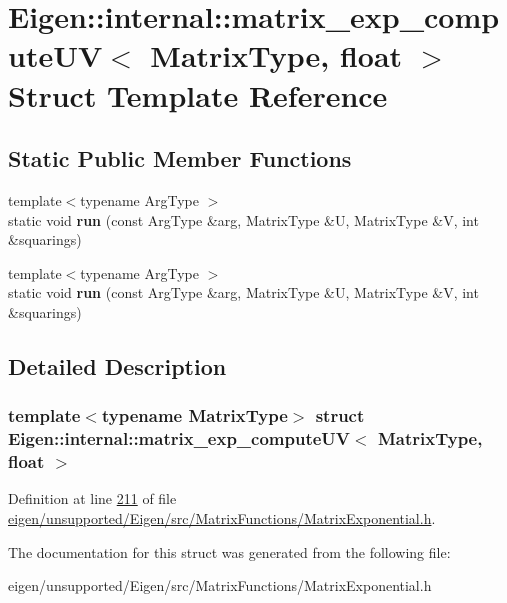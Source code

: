 \hypertarget{struct_eigen_1_1internal_1_1matrix__exp__compute_u_v_3_01_matrix_type_00_01float_01_4}{}\section{Eigen\+:\+:internal\+:\+:matrix\+\_\+exp\+\_\+compute\+UV$<$ Matrix\+Type, float $>$ Struct Template Reference}
\label{struct_eigen_1_1internal_1_1matrix__exp__compute_u_v_3_01_matrix_type_00_01float_01_4}
\subsection*{Static Public Member Functions}
\begin{DoxyCompactItemize}
\item 
\mbox{\label{struct_eigen_1_1internal_1_1matrix__exp__compute_u_v_3_01_matrix_type_00_01float_01_4_a1e11710dc66f8129a0c6266eb05a7e6a}} 
{\footnotesize template$<$typename Arg\+Type $>$ }\\static void {\bfseries run} (const Arg\+Type \&arg, Matrix\+Type \&U, Matrix\+Type \&V, int \&squarings)
\item 
\mbox{\label{struct_eigen_1_1internal_1_1matrix__exp__compute_u_v_3_01_matrix_type_00_01float_01_4_a1e11710dc66f8129a0c6266eb05a7e6a}} 
{\footnotesize template$<$typename Arg\+Type $>$ }\\static void {\bfseries run} (const Arg\+Type \&arg, Matrix\+Type \&U, Matrix\+Type \&V, int \&squarings)
\end{DoxyCompactItemize}


\subsection{Detailed Description}
\subsubsection*{template$<$typename Matrix\+Type$>$\newline
struct Eigen\+::internal\+::matrix\+\_\+exp\+\_\+compute\+U\+V$<$ Matrix\+Type, float $>$}



Definition at line \hyperlink{eigen_2unsupported_2_eigen_2src_2_matrix_functions_2_matrix_exponential_8h_source_l00211}{211} of file \hyperlink{eigen_2unsupported_2_eigen_2src_2_matrix_functions_2_matrix_exponential_8h_source}{eigen/unsupported/\+Eigen/src/\+Matrix\+Functions/\+Matrix\+Exponential.\+h}.



The documentation for this struct was generated from the following file\+:\begin{DoxyCompactItemize}
\item 
eigen/unsupported/\+Eigen/src/\+Matrix\+Functions/\+Matrix\+Exponential.\+h\end{DoxyCompactItemize}
